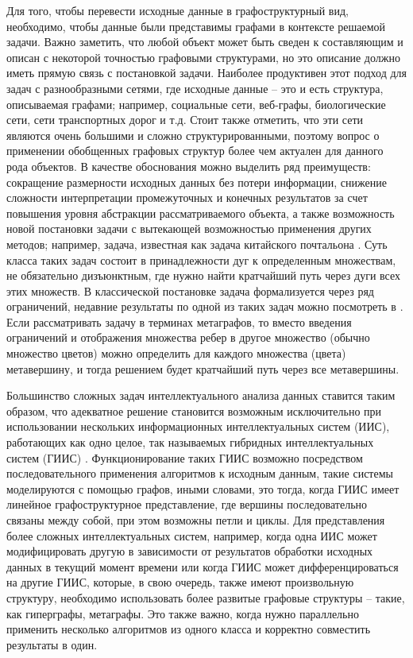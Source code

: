 Для того, чтобы перевести исходные данные в графоструктурный вид, необходимо, чтобы данные были представимы графами в контексте решаемой задачи. Важно заметить, что любой объект может быть сведен к составляющим и описан с некоторой точностью графовыми структурами, но это описание должно иметь прямую связь с постановкой задачи. Наиболее продуктивен этот подход для задач с разнообразными сетями, где исходные данные -- это и есть структура, описываемая графами; например, социальные сети, веб-графы, биологические сети, сети транспортных дорог и т.д. Стоит также отметить, что эти сети являются очень большими и сложно структурированными, поэтому вопрос о применении обобщенных графовых структур более чем актуален для данного рода объектов. В качестве обоснования можно выделить ряд преимуществ: сокращение размерности исходных данных без потери информации, снижение сложности интерпретации промежуточных и конечных результатов за счет повышения уровня абстракции рассматриваемого объекта, а также возможность новой постановки задачи с вытекающей возможностью применения других методов; например, задача, известная как задача китайского почтальона \cite{chinaPostman}. Суть класса таких задач состоит в принадлежности дуг к определенным множествам, не обязательно дизъюнктным, где нужно найти кратчайший путь через дуги всех этих множеств. В классической постановке задача формализуется через ряд ограничений, недавние результаты по одной из таких задач можно посмотреть в \cite{metroParis}. Если рассматривать задачу в терминах метаграфов, то вместо введения ограничений и отображения множества ребер в другое множество (обычно множество цветов) можно определить для каждого множества (цвета) метавершину, и тогда решением будет кратчайший путь через все метавершины. 

Большинство сложных задач интеллектуального анализа данных ставится таким образом, что адекватное решение становится возможным исключительно при использовании нескольких информационных интеллектуальных систем (ИИС), работающих как одно целое, так называемых гибридных интеллектуальных систем (ГИИС) \cite{BluminPrinkovTend, ChernenkiiPI, ChernenkiiNRP, ChernenkiiNI}. Функционирование таких ГИИС возможно посредством последовательного применения алгоритмов к исходным данным, такие системы моделируются с помощью графов, иными словами, это тогда, когда ГИИС имеет линейное графоструктурное представление, где вершины последовательно связаны между собой, при этом возможны петли и циклы. Для представления более сложных интеллектуальных систем, например, когда одна ИИС может модифицировать другую в зависимости от результатов обработки исходных данных в текущий момент времени или когда ГИИС может дифференцироваться на другие ГИИС, которые, в свою очередь, также имеют произвольную структуру, необходимо использовать более развитые графовые структуры -- такие, как гиперграфы, метаграфы. Это также важно, когда нужно параллельно применить несколько алгоритмов из одного класса и корректно совместить результаты в один.


